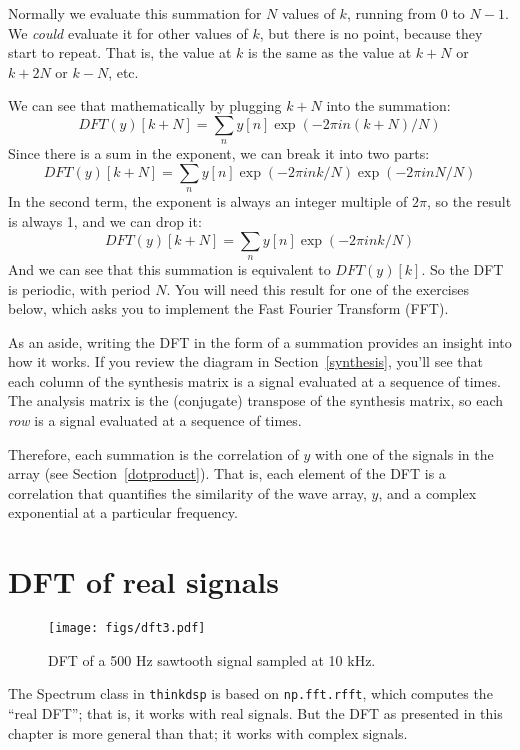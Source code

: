 Normally we evaluate this summation for $N$ values of $k$, running from
0 to $N-1$.  We {\em could} evaluate it for other values of $k$, but
there is no point, because they start to repeat.  That is, the value at
$k$ is the same as the value at $k+N$ or $k+2N$ or $k-N$, etc.

We can see that mathematically by plugging $k+N$ into the summation:
%
\[ DFT(y)[k+N] = \sum_n y[n] \exp(-2 \pi i n (k+N) / N) \]
%
Since there is a sum in the exponent, we can break it into two parts:
%
\[ DFT(y)[k+N] = \sum_n y[n] \exp(-2 \pi i n k / N)  \exp(-2 \pi i n N / N) \]
%
In the second term, the exponent is always an integer multiple of
$2 \pi$, so the result is always 1, and we can drop it:
%
\[ DFT(y)[k+N] = \sum_n y[n] \exp(-2 \pi i n k / N) \]
%
And we can see that this summation is equivalent to $ DFT(y)[k]$.
So the DFT is periodic, with period $N$.  You will need this result
for one of the exercises below, which asks you to implement the Fast Fourier
Transform (FFT).

As an aside, writing the DFT in the form of a summation provides an
insight into how it works.  If you review the diagram in
Section~\ref{synthesis}, you'll see that each column of the synthesis matrix
is a signal evaluated at a sequence of times.  The analysis matrix is
the (conjugate) transpose of the synthesis matrix, so each {\em row}
is a signal evaluated at a sequence of times.

Therefore, each summation is the correlation of $y$ with one of the
signals in the array (see Section~\ref{dotproduct}).  That is, each
element of the DFT is a correlation that quantifies the similarity of
the wave array, $y$, and a complex exponential at a particular
frequency.


\section{DFT of real signals}

\begin{figure}
	\centerline{\texttt{[image: figs/dft3.pdf]}}
	\caption{DFT of a 500 Hz sawtooth signal sampled at 10 kHz.}
	\label{fig.dft3}
\end{figure}

The Spectrum class in {\tt thinkdsp} is based on {\tt np.fft.rfft},
which computes the ``real DFT''; that is, it works with real signals.
But the DFT as presented in this chapter is more general than that; it
works with complex signals.

